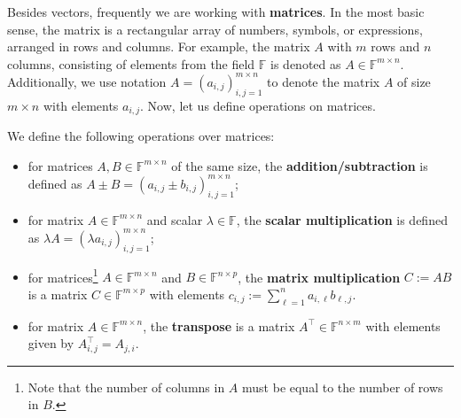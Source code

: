 \documentclass[../../book.tex]{subfiles}
\begin{document}
Besides vectors, frequently we are working with \textbf{matrices}. In the most
basic sense, the matrix is a rectangular array of numbers, symbols, or
expressions, arranged in rows and columns. For example, the matrix $A$ with $m$
rows and $n$ columns, consisting of elements from the field $\mathbb{F}$
is denoted as $A \in \mathbb{F}^{m \times n}$. Additionally, we use notation $A
= (a_{i,j})_{i,j=1}^{m \times n}$ to denote the matrix $A$ of size $m
\times n$ with elements $a_{i,j}$. Now, let us define operations on matrices.

\begin{definition}\label{def:matrix-ops}
    We define the following operations over matrices:
    \begin{itemize}
        \item for matrices $A,B \in \mathbb{F}^{m \times n}$ of the same size, the \textbf{addition/subtraction} is defined as $A \pm B = (a_{i,j} \pm b_{i,j})_{i,j=1}^{m \times n}$;
        \item for matrix $A \in \mathbb{F}^{m \times n}$ and scalar $\lambda \in \mathbb{F}$, the \textbf{scalar multiplication} is defined as $\lambda A = (\lambda a_{i,j})_{i,j=1}^{m \times n}$;
        \item for matrices\footnote{ Note that the number of columns in $A$ must be equal to the number of rows in $B$.} $A \in \mathbb{F}^{m \times n}$ and $B \in \mathbb{F}^{n \times p}$, the \textbf{matrix multiplication} $C := AB$ is a matrix $C \in \mathbb{F}^{m \times p}$ with elements $c_{i,j} := \sum_{\ell=1}^{n} a_{i,\ell}b_{\ell,j}$.
        \item for matrix $A \in \mathbb{F}^{m \times n}$, the \textbf{transpose} is a matrix $A^{\top} \in \mathbb{F}^{n \times m}$ with elements given by $A^{\top}_{i,j} = A_{j,i}$.
    \end{itemize}
\end{definition}
\end{document}
